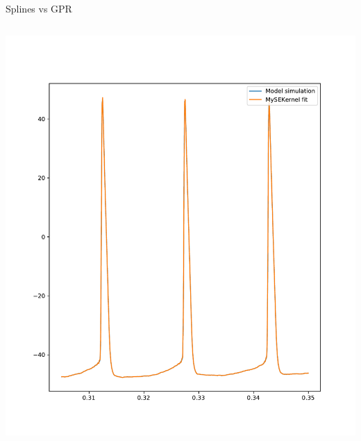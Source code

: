 \documentclass[presentation]{beamer}
\begin{document}
\begin{frame}[plain,label={sec:org4ebdf23}]{Splines vs GPR}
\begin{columns}
\begin{column}{0.5\columnwidth}
\begin{center}
\includegraphics[width=1.1\textwidth]{./SEKernel_f_6d23e2_l_5d71e-8_n_0d1.pdf}
\end{center}
\end{column}
\end{columns}
\end{frame}
\end{document}
